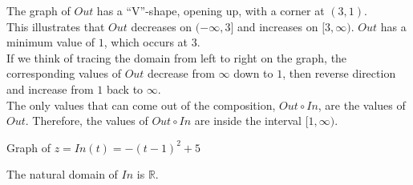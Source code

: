 \documentclass{ximera}
\begin{document}
The graph of $Out$ has a ``V''-shape, opening up, with a corner at $(3,1)$. \\
This illustrates that $Out$ decreases on $(-\infty, 3]$ and increases on $[3, \infty)$.  $Out$ has a minimum value of $1$, which occurs at $3$. \\

If we think of tracing the domain from left to right on the graph, the corresponding values of $Out$ decrease from $\infty$ down to $1$, then reverse direction and increase from $1$ back to $\infty$. \\



The only values that can come out of the composition, $Out \circ In$, are the values of $Out$. Therefore, the values of $Out \circ In$ are inside the interval $[1, \infty)$.  



Graph of $z = In(t) = -(t-1)^2 + 5$





\begin{image}
\end{image}
The natural domain of $In$ is $\mathbb{R}$. \\
\end{document}
